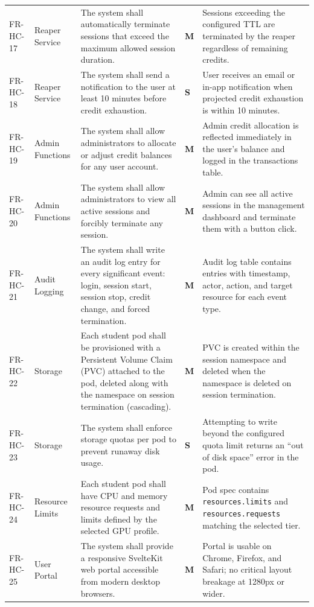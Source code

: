\documentclass[12pt,a4paper]{article}
\newcommand{\Must}{\textcolor{dangered}{\textbf{M}}}
\newcommand{\Should}{\textcolor{warningyellow}{\textbf{S}}}
\begin{document}
\begin{longtable}{@{}L{2.1cm}L{1.8cm}L{5cm}C{1.4cm}L{5cm}@{}}
  FR-HC-17 & Reaper Service & The system shall automatically terminate sessions that exceed the maximum allowed session duration. & \Must & Sessions exceeding the configured TTL are terminated by the reaper regardless of remaining credits. \\
    FR-HC-18 & Reaper Service & The system shall send a notification to the user at least 10 minutes before credit exhaustion. & \Should & User receives an email or in-app notification when projected credit exhaustion is within 10 minutes. \\
  FR-HC-19 & Admin Functions & The system shall allow administrators to allocate or adjust credit balances for any user account. & \Must & Admin credit allocation is reflected immediately in the user's balance and logged in the transactions table. \\
    FR-HC-20 & Admin Functions & The system shall allow administrators to view all active sessions and forcibly terminate any session. & \Must & Admin can see all active sessions in the management dashboard and terminate them with a button click. \\
  FR-HC-21 & Audit Logging & The system shall write an audit log entry for every significant event: login, session start, session stop, credit change, and forced termination. & \Must & Audit log table contains entries with timestamp, actor, action, and target resource for each event type. \\
    FR-HC-22 & Storage & Each student pod shall be provisioned with a Persistent Volume Claim (PVC) attached to the pod, deleted along with the namespace on session termination (cascading). & \Must & PVC is created within the session namespace and deleted when the namespace is deleted on session termination. \\
  FR-HC-23 & Storage & The system shall enforce storage quotas per pod to prevent runaway disk usage. & \Should & Attempting to write beyond the configured quota limit returns an ``out of disk space'' error in the pod. \\
    FR-HC-24 & Resource Limits & Each student pod shall have CPU and memory resource requests and limits defined by the selected GPU profile. & \Must & Pod spec contains \texttt{resources.limits} and \texttt{resources.requests} matching the selected tier. \\
  FR-HC-25 & User Portal & The system shall provide a responsive SvelteKit web portal accessible from modern desktop browsers. & \Must & Portal is usable on Chrome, Firefox, and Safari; no critical layout breakage at 1280px or wider. \\

\end{longtable}
\end{document}
